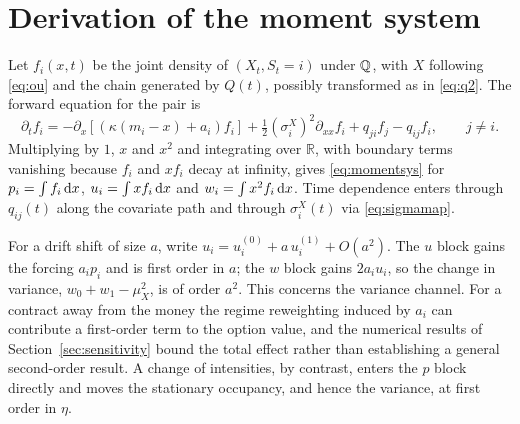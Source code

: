 \section{Derivation of the moment system}
\label{app:moments}

Let $f_i(x,t)$ be the joint density of $(X_t,S_t=i)$ under $\mathbb{Q}$, with $X$
following \eqref{eq:ou} and the chain generated by $Q(t)$, possibly
transformed as in \eqref{eq:q2}. The forward equation for the pair is
\begin{equation}
  \partial_t f_i
  = -\partial_x\!\left[\left(\kappa(m_i-x)+a_i\right)f_i\right]
    + \tfrac12\left(\sigma^X_i\right)^2\partial_{xx}f_i
    + q_{ji}f_j - q_{ij}f_i,\qquad j\neq i.
\end{equation}
Multiplying by $1$, $x$ and $x^2$ and integrating over $\mathbb{R}$, with
boundary terms vanishing because $f_i$ and $xf_i$ decay at infinity, gives
\eqref{eq:momentsys} for $p_i=\int f_i\,\mathrm{d} x$, $u_i=\int xf_i\,\mathrm{d} x$ and
$w_i=\int x^2f_i\,\mathrm{d} x$. Time dependence enters through $q_{ij}(t)$ along
the covariate path and through $\sigma^X_i(t)$ via \eqref{eq:sigmamap}.

For a drift shift of size $a$, write $u_i=u_i^{(0)}+a\,u_i^{(1)}+O(a^2)$. The
$u$ block gains the forcing $a_ip_i$ and is first order in $a$; the $w$ block
gains $2a_iu_i$, so the change in variance, $w_0+w_1-\mu_X^2$, is of order
$a^2$. This concerns the variance channel. For a contract away from the money
the regime reweighting induced by $a_i$ can contribute a first-order term to
the option value, and the numerical results of Section~\ref{sec:sensitivity}
bound the total effect rather than establishing a general second-order result.
A change of intensities, by contrast, enters the $p$ block directly and moves
the stationary occupancy, and hence the variance, at first order in $\eta$.
